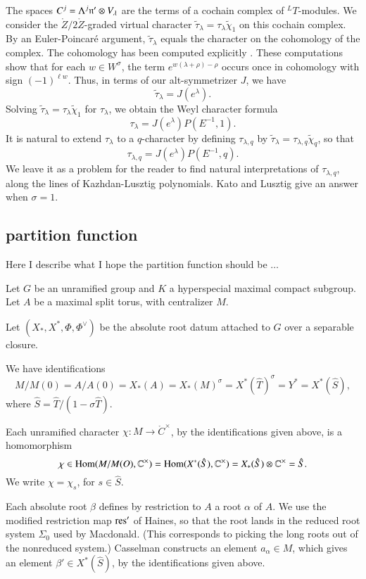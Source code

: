 The spaces $C^j=\Lambda^j {\mathfrak n}'\otimes V_\lambda$ are the terms of a cochain complex of ${}^LT$-modules.
We consider the $\ring{Z}/2\ring{Z}$-graded virtual character $\tilde \tau_\lambda  = \tau_\lambda \tilde \chi_{1}$ on  
this cochain complex.
By an Euler-Poincar\'e argument, 
$\tilde\tau_\lambda$ equals the character on the cohomology of the complex.  The cohomology has 
been computed explicitly \cite{kostant1961lie}.
These computations show that for each $w\in W^\sigma$, the term $e^{w(\lambda+\rho)-\rho}$ 
occurs once in cohomology with sign $(-1)^{\ell w}$.
Thus, in terms of our alt-symmetrizer $J$, we have
\[
\tilde \tau_\lambda = J(e^\lambda).
\]
Solving $\tilde \tau_\lambda = \tau_\lambda \tilde \chi_1$ for $\tau_\lambda$, we obtain the Weyl character formula
\[
\tau_\lambda = J(e^\lambda) P(E^{-1},1).
\]
It is natural to extend $\tau_\lambda$ to a $q$-character by defining $\tau_{\lambda,q}$ by
$\tilde \tau_\lambda = \tau_{\lambda,q} \tilde \chi_q$, so that
\[
\tau_{\lambda,q} = J(e^\lambda) P(E^{-1},q).
\]
We leave it as a problem for the reader to find natural interpretations of $\tau_{\lambda,q}$, along the lines of Kazhdan-Lusztig
polynomials.  Kato and Lusztig give an answer when $\sigma=1$.


\subsection{partition function}

Here I describe what I hope the partition function should be $\ldots$

Let $G$ be an unramified group and $K$ a hyperspecial maximal compact subgroup.  Let $A$ be a maximal split torus,
with centralizer $M$.

Let $(X_*,X^*,\Phi,\Phi^\vee)$ be the absolute root datum attached to $G$ over a separable closure.

We have identifications
\[
M/M(0)=A/A(0)=X_*(A)=X_*(M)^\sigma  =X^*(\hat T)^\sigma = Y^* = X^*(\hat S),
\]
where $\hat S = \hat T/(1-\sigma \hat T)$.

Each unramified character $\chi:M\to \ring{C}^\times$, by the identifications given above, is a homomorphism
\[
\chi\in{\operatorname{Hom}}(M/M(O),\mathbb{C}^\times) = {\operatorname{Hom}}(X^*(\hat S),\mathbb{C}^\times) = X_*(\hat S)\otimes \mathbb{C}^\times = \hat S.
\]
We write $\chi = \chi_s$, for $s\in\hat S$.


Each absolute root $\beta$ defines by restriction to $A$ a root $\alpha$ of $A$.  We use the modified
restriction map ${\operatorname{res}}'$ of Haines, so that the root lands in the reduced root system $\Sigma_0$ used by Macdonald.
(This corresponds to picking the long roots out of the nonreduced system.)
Casselman constructs an element $a_\alpha \in M$, which gives an element $\beta'\in X^*(\hat S)$,
by the identifications given above.  

